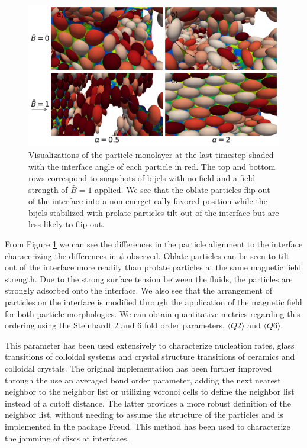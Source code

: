 \begin{figure}
        \centering
        \includegraphics[scale = 0.4]{figures/results/paper1/psi_concat.png}
        \caption{Visualizations of the particle monolayer at the last timestep shaded with the interface angle of each particle in red. The top and bottom
                 rows correspond to snapshots of bijels with no field and a field strength of $\bar{B} = 1$ applied. We see that the oblate particles flip
                 out of the interface into a non energetically favored position while the bijels stabilized with prolate particles tilt out of the interface
                 but are less likely to flip out.}
        \label{fig:psi_viz_ss}
\end{figure}

From Figure \ref{fig:psi_viz_ss} we can see the differences in the particle alignment to the interface characerizing the differences in $\psi$ observed. Oblate
particles can be seen to tilt out of the interface more readily than prolate particles at the same magnetic field strength. Due to the strong surface tension
between the fluids, the particles are strongly adsorbed onto the interface. We also see that the arrangement of particles on the interface is modified through the
application of the magnetic field for both particle morphologies. We can obtain quantitative metrics regarding this ordering using the Steinhardt 2 and 6 fold
order parameters, $\langle Q2 \rangle$ and $\langle Q6 \rangle$. 

This parameter has been used extensively to characterize nucleation rates, glass transitions of colloidal systems and crystal structure transitions of ceramics 
and colloidal crystals. \cite{vagberg_glassiness_2011, besseling_three-dimensional_2007, schall_structural_2007} The original implementation has been further 
improved through the use an averaged bond order parameter, adding the next nearest neighbor to the neighbor list or utilizing voronoi cells to define the 
neighbor list instead of a cutoff distance. The latter provides a more robust definition of the neighbor list, without needing to assume the structure of 
the particles and is implemented in the package Freud. \cite{ramasubramani_freud_2020} This method has been used to characterize the jamming of discs at 
interfaces. \cite{ozawa_jamming_2012}

